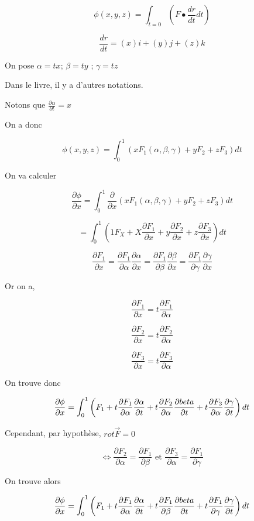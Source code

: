 \[\phi(x,y,z) = \int _{t=0} \left( F\bullet \frac{dr}{dt} dt \right) \]

\[\frac{dr}{dt} = (x) i +(y)j +(z) k\]

On pose $\alpha = tx$; $\beta = ty $ ; $\gamma = tz$

Dans le livre, il y a d'autres notations.

Notons que $\frac{\partial \alpha}{\partial t} = x$

On a donc

\[\phi (x,y,z) = \int_0^1 \left( x F_1 (\alpha, \beta, \gamma ) + y F_2 + z F_3 \right) dt \]

On va calculer

\[\frac{\partial \phi}{\partial x} = \int_0^1 \frac{\partial}{\partial x} \left( x F_1 (\alpha, \beta, \gamma ) + y F_2 + z F_3 \right) dt\]

\[= \int_0^1 \left( 1F_X +X \frac{\partial F_1}{\partial x} + y \frac{\partial F_2}{\partial x} + z \frac{\partial F_3}{\partial x} \right) dt\]


\[
\frac{\partial F_1}{\partial x} = \frac{\partial F_1}{\partial \alpha} \frac{\partial \alpha}{\partial x}
=\frac{\partial F_1}{\partial \beta} \frac{\partial \beta}{\partial x}
=\frac{\partial F_1}{\partial \gamma} \frac{\partial \gamma}{\partial x}
\]

Or on a,

\[\frac{\partial F_1}{\partial x} = t \frac{\partial F_1}{\partial \alpha}\]

\[\frac{\partial F_2}{\partial x} = t \frac{\partial F_2}{\partial \alpha}\]

\[\frac{\partial F_3}{\partial x} = t \frac{\partial F_3}{\partial \alpha}\]

On trouve donc

\[\frac{\partial \phi}{\partial x}=\int_0^1 \left( F_1+t \frac{\partial F_1}{\partial \alpha} \frac{\partial \alpha}{\partial t}
+t \frac{\partial F_2}{\partial \alpha} \frac{\partial \\beta}{\partial t}
+t \frac{\partial F_3}{\partial \alpha} \frac{\partial \gamma}{\partial t}
\right) dt
\]

Cependant, par hypothèse, $rot \vec F = 0$

\[\Leftrightarrow  \frac{\partial F_2}{\partial \alpha} = \frac{\partial F_1}{\partial \beta} \text{ et }  \frac{\partial F_3}{\partial \alpha} = \frac{\partial F_1}{\partial \gamma} \]

On trouve alors

\[
\frac{\partial \phi}{\partial x}=\int_0^1 \left( F_1 +t \frac{\partial F_1}{\partial \alpha} \frac{\partial \alpha}{\partial t}
+t \frac{\partial F_1}{\partial \beta} \frac{\partial \\beta}{\partial t}
+t \frac{\partial F_1}{\partial \gamma} \frac{\partial \gamma}{\partial t}
\right) dt
\]


